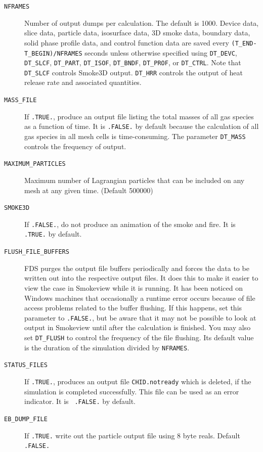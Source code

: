 \documentclass[11pt]{book}
\newcommand{\ct}{\tt\small}
\begin{document}
\begin{description}
\item[{\ct NFRAMES}] Number of output dumps per calculation. The default is 1000.
Device data, slice data, particle data, isosurface data, 3D smoke data, boundary data, solid phase profile data, and
control function data are saved every {\ct (T\_END-T\_BEGIN)/NFRAMES} seconds unless otherwise specified
using {\ct DT\_DEVC}, {\ct DT\_SLCF}, {\ct DT\_PART}, {\ct DT\_ISOF}, {\ct DT\_BNDF}, {\ct DT\_PROF},
or {\ct DT\_CTRL}. Note that {\ct DT\_SLCF} controls Smoke3D output. {\ct DT\_HRR} controls the
output of heat release rate and associated quantities.
\item[{\ct MASS\_FILE}] If {\ct .TRUE.}, produce an output file listing the total masses of all gas species as a function of time.
It is {\ct .FALSE.} by default because the calculation
of all gas species in all mesh cells is time-consuming. The parameter {\ct DT\_MASS} controls the frequency of output.
\item[{\ct MAXIMUM\_PARTICLES}] Maximum number of Lagrangian particles that can be included on any
mesh at any given time. (Default 500000)
\item[{\ct SMOKE3D}] If {\ct .FALSE.}, do not produce an animation of the smoke and fire. It is {\ct .TRUE.} by default.
\item[{\ct FLUSH\_FILE\_BUFFERS}] FDS
purges the output file buffers periodically and forces the data to be written out
into the respective output files. It does this to make it easier to view the case in Smokeview while it is running.
It has been noticed on Windows
machines that occasionally a runtime error occurs because of file
access problems related to the buffer flushing. If this happens, set
this parameter to {\ct .FALSE.}, but be aware that it may not be
possible to look at output in Smokeview until after the calculation is
finished. You may also set {\ct DT\_FLUSH} to control the frequency of the file flushing. Its default value is the duration of
the simulation divided by {\ct NFRAMES}.
\item[{\ct STATUS\_FILES}] If {\ct .TRUE.}, produces an output file
{\ct CHID.notready} which is deleted, if the simulation is completed
successfully. This file can be used as an error indicator. It is {\ct
.FALSE.} by default.
\item[{\ct EB\_DUMP\_FILE}] If {\ct .TRUE.} write out the particle output file using 8 byte reals. Default {\ct .FALSE.}
\end{description}
\end{document}
